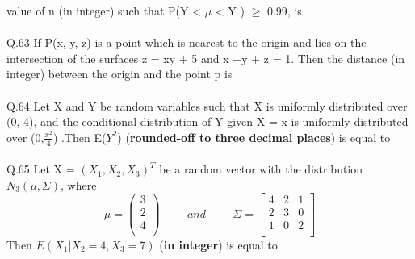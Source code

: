 \documentclass{book}[200pt]
\begin{document}
value of n (in integer) such that P(Y < $\mu$ < Y ) $\geq$ 0.99, is \underline{\hspace{2cm}}\\
\\
Q.63 If P(x, y, z) is a point which is nearest to the origin and lies on the intersection of the surfaces z = xy + 5 and x +y + z = 1. Then the distance (in integer) between the origin and the point p is \underline{\hspace{2cm}}\\
\\
Q.64 Let X and Y be random variables such that X is uniformly distributed over (0, 4), and the conditional distribution of Y given X = x is uniformly distributed over (0,$\frac{x^2}{4}$) .Then E($Y^2$) (\textbf{rounded-off to three decimal places}) is equal to \underline{\hspace{2cm}}\\
\\
Q.65 Let X = $(X_1, X_2, X_3)^T$ be a random vector with the distribution $N_3(\mu, \Sigma)$, where \[
\mu = \begin{pmatrix}
	3 \\
	2 \\
	4\\
\end{pmatrix}
\hspace{1cm} and \hspace{1cm} \Sigma = \begin{bmatrix}
	4 & 2 & 1 \\
	2 & 3 & 0 \\
	1 & 0 & 2 \\
\end{bmatrix}
\]
Then $E(X_1|X_2 = 4, X_3 = 7)$ (\textbf{in integer}) is equal to \underline{\hspace{2cm}}\\





	   
	   
	 
	  
	   
	   
	   


	  
	   
	   
	   
	   
	   
	   
	   
	   
	   
	   
	   
	 
	 
	 
	 
	 
	 
	 
	 
	 
	 
	 
	 
	 

	 
	 
	 
	  
	
	 
	 	
	 	
	 	

	
	
	
	
	
	
	
	
	
	
	
	
	
	
	
	
\end{document}
